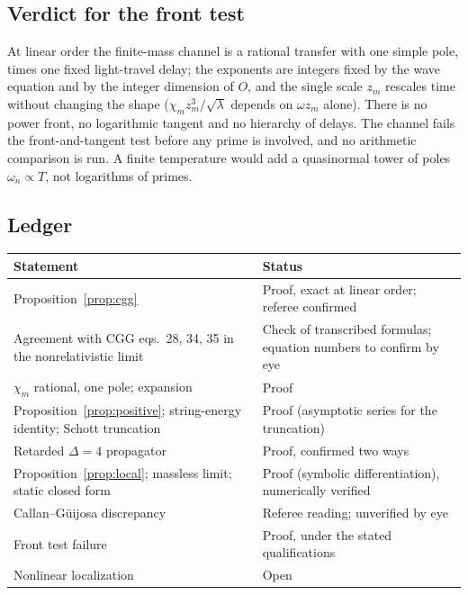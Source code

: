 \subsection{Verdict for the front test}

At linear order the finite-mass channel is a rational transfer with one simple pole, times one fixed light-travel
delay; the exponents are integers fixed by the wave equation and by the integer dimension of $O$, and the single scale
$z_m$ rescales time without changing the shape ($\chi_mz_m^3/\sqrt\lambda$ depends on $\omega z_m$ alone). There is no
power front, no logarithmic tangent and no hierarchy of delays. The channel fails the front-and-tangent test before
any prime is involved, and no arithmetic comparison is run. A finite temperature would add a quasinormal tower of
poles $\omega_n\propto T$, not logarithms of primes.

\subsection*{Ledger}
\begin{center}\small
\begin{tabular}{@{}p{}p{}@{}}
\toprule
Statement & Status\\
\midrule
Proposition~\ref{prop:cgg} & Proof, exact at linear order; referee confirmed\\
Agreement with CGG eqs.\ 28, 34, 35 in the nonrelativistic limit & Check of transcribed formulas; equation numbers to confirm by eye\\
$\chi_m$ rational, one pole; expansion & Proof\\
Proposition~\ref{prop:positive}; string-energy identity; Schott truncation & Proof (asymptotic series for the truncation)\\
Retarded $\Delta=4$ propagator & Proof, confirmed two ways\\
Proposition~\ref{prop:local}; massless limit; static closed form & Proof (symbolic differentiation), numerically verified\\
Callan--Güijosa discrepancy & Referee reading; unverified by eye\\
Front test failure & Proof, under the stated qualifications\\
Nonlinear localization & Open\\
\bottomrule
\end{tabular}
\end{center}
